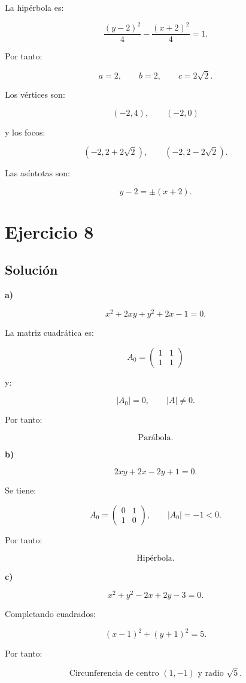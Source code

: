 \documentclass[11pt,a4paper]{article}
\begin{document}
La hipérbola es:

\[
\frac{(y-2)^2}{4}
-
\frac{(x+2)^2}{4}
=
1.
\]

Por tanto:

\[
a=2,
\qquad
b=2,
\qquad
c=2\sqrt2.
\]

Los vértices son:

\[
\boxed{
(-2,4),
\qquad
(-2,0)
}
\]

y los focos:

\[
\boxed{
(-2,2+2\sqrt2),
\qquad
(-2,2-2\sqrt2).
}
\]

Las asíntotas son:

\[
\boxed{
y-2=\pm(x+2).
}
\]

\section{Ejercicio 8}
\subsection{Solución}

\textbf{a)}

\[
x^2+2xy+y^2+2x-1=0.
\]

La matriz cuadrática es:

\[
A_0=
\begin{pmatrix}
1&1\\
1&1
\end{pmatrix}
\]

y:

\[
|A_0|=0,
\qquad
|A|\neq0.
\]

Por tanto:

\[
\boxed{\text{Parábola}.}
\]

\textbf{b)}

\[
2xy+2x-2y+1=0.
\]

Se tiene:

\[
A_0=
\begin{pmatrix}
0&1\\
1&0
\end{pmatrix},
\qquad
|A_0|=-1<0.
\]

Por tanto:

\[
\boxed{\text{Hipérbola}.}
\]

\textbf{c)}

\[
x^2+y^2-2x+2y-3=0.
\]

Completando cuadrados:

\[
(x-1)^2+(y+1)^2=5.
\]

Por tanto:

\[
\boxed{
\text{Circunferencia de centro }(1,-1)
\text{ y radio }\sqrt5.
}
\]
\end{document}
